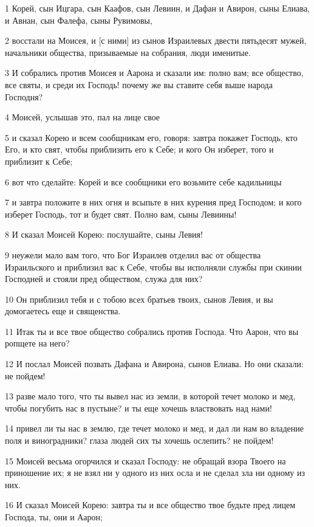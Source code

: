 \par 1 Корей, сын Ицгара, сын Каафов, сын Левиин, и Дафан и Авирон, сыны Елиава, и Авнан, сын Фалефа, сыны Рувимовы,
\par 2 восстали на Моисея, и [с ними] из сынов Израилевых двести пятьдесят мужей, начальники общества, призываемые на собрания, люди именитые.
\par 3 И собрались против Моисея и Аарона и сказали им: полно вам; все общество, все святы, и среди их Господь! почему же вы ставите себя выше народа Господня?
\par 4 Моисей, услышав это, пал на лице свое
\par 5 и сказал Корею и всем сообщникам его, говоря: завтра покажет Господь, кто Его, и кто свят, чтобы приблизить его к Себе; и кого Он изберет, того и приблизит к Себе;
\par 6 вот что сделайте: Корей и все сообщники его возьмите себе кадильницы
\par 7 и завтра положите в них огня и всыпьте в них курения пред Господом; и кого изберет Господь, тот и будет свят. Полно вам, сыны Левиины!
\par 8 И сказал Моисей Корею: послушайте, сыны Левия!
\par 9 неужели мало вам того, что Бог Израилев отделил вас от общества Израильского и приблизил вас к Себе, чтобы вы исполняли службы при скинии Господней и стояли пред обществом, служа для них?
\par 10 Он приблизил тебя и с тобою всех братьев твоих, сынов Левия, и вы домогаетесь еще и священства.
\par 11 Итак ты и все твое общество собрались против Господа. Что Аарон, что вы ропщете на него?
\par 12 И послал Моисей позвать Дафана и Авирона, сынов Елиава. Но они сказали: не пойдем!
\par 13 разве мало того, что ты вывел нас из земли, в которой течет молоко и мед, чтобы погубить нас в пустыне? и ты еще хочешь властвовать над нами!
\par 14 привел ли ты нас в землю, где течет молоко и мед, и дал ли нам во владение поля и виноградники? глаза людей сих ты хочешь ослепить? не пойдем!
\par 15 Моисей весьма огорчился и сказал Господу: не обращай взора Твоего на приношение их; я не взял ни у одного из них осла и не сделал зла ни одному из них.
\par 16 И сказал Моисей Корею: завтра ты и все общество твое будьте пред лицем Господа, ты, они и Аарон;
